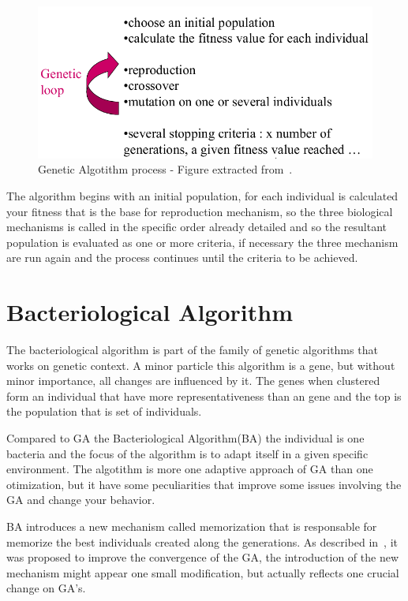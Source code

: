 \begin{figure}[htbp]
	\centering
	\includegraphics[width=\columnwidth]{img/ga.png}
	\caption{Genetic Algotithm process - Figure extracted from~\cite{baudry}.}\label{fig:ga}
\end{figure}

The algorithm begins with an initial population, for each individual is calculated
your fitness that is the base for reproduction mechanism, so the three biological
mechanisms is called in the specific order already detailed and so the resultant
population is evaluated as one or more criteria, if necessary the three mechanism
are run again and the process continues until the criteria to be achieved.

\section{Bacteriological Algorithm}

The bacteriological algorithm is part of the family of genetic algorithms that
works on genetic context. A minor particle this algorithm is a gene, but without
minor importance, all changes are influenced by it. The genes when clustered form
an individual that have more representativeness than an gene and the top is the
population that is set of individuals.

Compared to GA the Bacteriological Algorithm(BA) the individual is one bacteria
and the focus of the algorithm is to adapt itself in a given specific environment.
The algotithm is more one adaptive approach of GA than one otimization, but it have
some peculiarities that improve some issues involving the GA and change your behavior.

BA introduces a new mechanism called memorization that is responsable for memorize
the best individuals created along the generations. As described in~\cite{baudry},
it was proposed to improve the convergence of the GA, the introduction of the new
mechanism might appear one small modification, but actually reflects one crucial
change on GA's.

